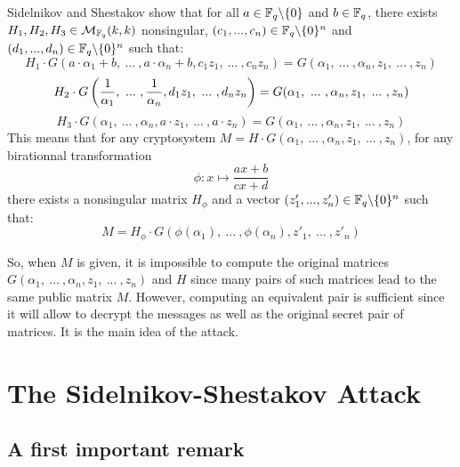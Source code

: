 \documentclass[a4paper]{article}
\begin{document}
Sidelnikov and Shestakov show \cite{SidelShes92} that for all $a \in \mathbb{F}_q\backslash\{0\}$ and $b \in \mathbb{F}_q$, there exists $H_1, H_2, H_3 \in \mathcal{M}_{\mathbb{F}_q}(k,k)$ nonsingular, $(c_1,... ,c_n) \in \mathbb{F}_q\backslash\{0\}^{n}$ and $(d_1,... ,d_n) \in \mathbb{F}_q\backslash\{0\}^{n}$ such that:
\begin{equation}
H_1\cdot G(a\cdot\alpha_1 + b, \ ... \ , a\cdot \alpha_n + b, c_1z_1, \ ... \ , c_n z_n) = G(\alpha_1, \ ... \ , \alpha_n, z_1, \ ... \ , z_n)
\label{eq1}
\end{equation}
\begin{equation}
H_2\cdot G\left( \frac{1}{\alpha_1}, \ ... \ , \frac{1}{\alpha_n}, d_1z_1, \ ... \ , d_n z_n \right) = G(\alpha_1, \ ... \ , \alpha_n, z_1, \ ... \ , z_n) \\
\label{eq2}
\end{equation}
\begin{equation}
H_3\cdot G\left( \alpha_1, \ ... \ , \alpha_n, a\cdot z_1, \ ... \ , a\cdot z_n \right) = G(\alpha_1, \ ... \ , \alpha_n, z_1, \ ... \ , z_n)
\label{eq3}
\end{equation}
This means that for any cryptosystem $M = H\cdot G(\alpha_1, \ ... \ , \alpha_n, z_1, \ ... \ , z_n)$, for any birationnal transformation
$$ \phi : x \mapsto \frac{ax+b}{cx+d}$$
there exists a nonsingular matrix $H_{\phi}$ and a vector $(z'_1,... ,z'_n) \in \mathbb{F}_q\backslash\{0\}^{n}$ such that:
\begin{equation}
 M = H_{\phi}\cdot G(\phi(\alpha_1), \ ... \ , \phi(\alpha_n), z'_1, \ ... \ , z'_n)
 \label{eq4}
\end{equation}


So, when $M$ is given, it is impossible to compute the original matrices $G(\alpha_1, \ ... \ , \alpha_n, z_1, \ ... \ , z_n)$ and $H$ since many pairs of such matrices lead to the same public matrix $M$.
However, computing an equivalent pair is sufficient since it will allow to decrypt the messages as well as the original secret pair of matrices.
It is the main idea of the attack.



\section{The Sidelnikov-Shestakov Attack}
\label{sec:SSattack}
\subsection{A first important remark}
\end{document}
